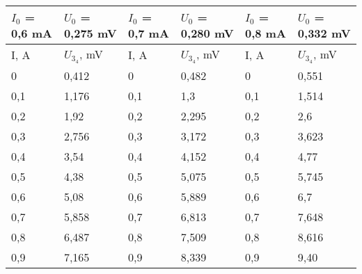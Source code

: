 \documentclass[a4paper, 12pt]{article}
\begin{document}
\begin{center}
\begin{tabular}{|l|l|l|l|l|l|}
\hline
$I_0$ = 0,6 mA & $U_0$ = 0,275 mV & $I_0$ = 0,7 mA & $U_0$ = 0,280 mV & $I_0$ = 0,8 mA & $U_0$ = 0,332 mV \\ \hline
I, A           & $U_3_4$, mV      & I, A           & $U_3_4$, mV      & I, A           & $U_3_4$, mV      \\ \hline
0              & 0,412            & 0              & 0,482            & 0              & 0,551            \\ \hline
0,1            & 1,176            & 0,1            & 1,3              & 0,1            & 1,514            \\ \hline
0,2            & 1,92             & 0,2            & 2,295            & 0,2            & 2,6              \\ \hline
0,3            & 2,756            & 0,3            & 3,172            & 0,3            & 3,623            \\ \hline
0,4            & 3,54             & 0,4            & 4,152            & 0,4            & 4,77             \\ \hline
0,5            & 4,38             & 0,5            & 5,075            & 0,5            & 5,745            \\ \hline
0,6            & 5,08             & 0,6            & 5,889            & 0,6            & 6,7              \\ \hline
0,7            & 5,858            & 0,7            & 6,813            & 0,7            & 7,648            \\ \hline
0,8            & 6,487            & 0,8            & 7,509            & 0,8            & 8,616            \\ \hline
0,9            & 7,165            & 0,9            & 8,339            & 0,9            & 9,40             \\ \hline
\end{tabular}
\end{center}
\end{document}
